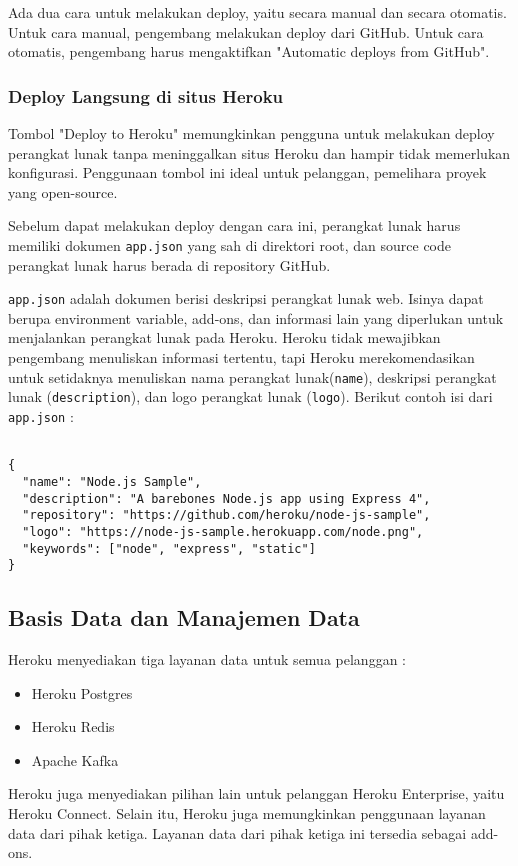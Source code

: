 Ada dua cara untuk melakukan deploy, yaitu secara manual dan secara otomatis. Untuk cara manual, pengembang melakukan deploy dari GitHub.
Untuk cara otomatis, pengembang harus mengaktifkan "Automatic deploys from GitHub".

\subsubsection{Deploy Langsung di situs Heroku}
Tombol "Deploy to Heroku" memungkinkan pengguna untuk melakukan deploy perangkat lunak tanpa meninggalkan situs Heroku dan hampir tidak memerlukan konfigurasi. Penggunaan tombol ini ideal untuk pelanggan, pemelihara proyek yang open-source.

Sebelum dapat melakukan deploy dengan cara ini, perangkat lunak harus memiliki dokumen \texttt{app.json} yang sah di direktori root, dan source code perangkat lunak harus berada di repository GitHub.

\texttt{app.json} adalah dokumen berisi deskripsi perangkat lunak web. Isinya dapat berupa environment variable, add-ons, dan informasi lain yang diperlukan untuk menjalankan perangkat lunak pada Heroku. Heroku tidak mewajibkan pengembang menuliskan informasi tertentu, tapi Heroku merekomendasikan untuk setidaknya menuliskan nama perangkat lunak(\texttt{name}), deskripsi perangkat lunak (\texttt{description}), dan logo perangkat lunak (\texttt{logo}). Berikut contoh isi dari \texttt{app.json} :
\begin{lstlisting}

{
  "name": "Node.js Sample",
  "description": "A barebones Node.js app using Express 4",
  "repository": "https://github.com/heroku/node-js-sample",
  "logo": "https://node-js-sample.herokuapp.com/node.png",
  "keywords": ["node", "express", "static"]
}

\end{lstlisting}

\subsection{Basis Data dan Manajemen Data}
Heroku menyediakan tiga layanan data untuk semua pelanggan :
\begin{itemize}
\item Heroku Postgres
\item Heroku Redis
\item Apache Kafka
\end{itemize}
Heroku juga menyediakan pilihan lain untuk pelanggan Heroku Enterprise, yaitu Heroku Connect. Selain itu, Heroku juga memungkinkan penggunaan layanan data dari pihak ketiga. Layanan data dari pihak ketiga ini tersedia sebagai add-ons.

